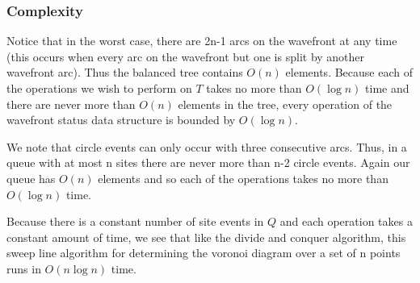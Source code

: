 \documentclass[12pt]{article}
\begin{document}
    \subsubsection{Complexity}

        Notice that in the worst case, there are 2n-1 arcs on the wavefront at any
        time (this occurs when every arc on the wavefront but one is split by another
        wavefront arc).  Thus the balanced tree contains $O(n)$ elements.
        Because each of the operations we wish to perform on $T$ takes no more than
        $O(\log n)$ time and there are never more than $O(n)$ elements in the tree,
        every operation of the wavefront status data structure is bounded by $O(\log n)$.

        We note that circle events can only occur with three consecutive arcs.  Thus,
        in a queue with at most n sites there are never more than n-2 circle events.  
        Again our queue has $O(n)$ elements and so each of the operations takes no more
        than $O(\log n)$ time.

        Because there is a constant number of site events in $Q$ and each operation
        takes a constant amount of time, we see that like the divide and conquer 
        algorithm, this sweep line algorithm for determining the voronoi diagram 
        over a set of n points runs in $O(n \log n)$ time.

\end{document}
